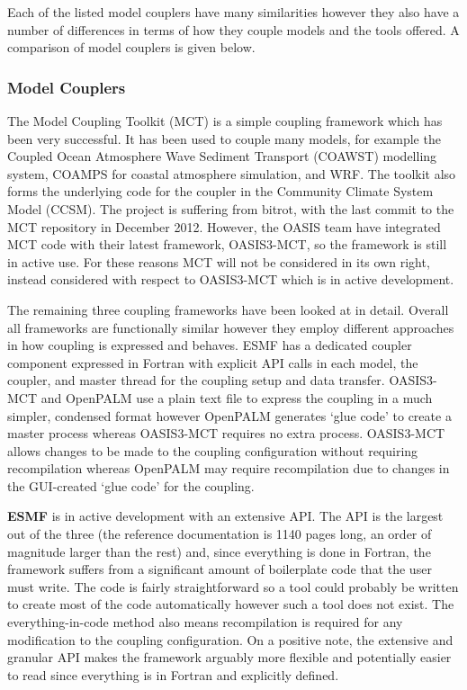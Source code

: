 \documentclass{acm_proc_article-sp}
\begin{document}
Each of the listed model couplers have many similarities however they also have
a number of differences in terms of how they couple models and the tools
offered. A comparison of model couplers is given below.

\subsubsection*{Model Couplers}

The Model Coupling Toolkit (MCT) \cite{Larson2005,Jacob2005} is a simple
coupling framework which has been very successful. It has been used to couple
many models, for example the Coupled Ocean Atmosphere Wave Sediment Transport
(COAWST) modelling system, COAMPS for coastal atmosphere simulation, and WRF.
The toolkit also forms the underlying code for the coupler in the Community
Climate System Model (CCSM). The project is suffering from bitrot, with the last
commit to the MCT repository in December 2012. However, the OASIS team have
integrated MCT code with their latest framework, OASIS3-MCT, so the framework is
still in active use. For these reasons MCT will not be considered in its own
right, instead considered with respect to OASIS3-MCT which is in active
development.

The remaining three coupling frameworks have been looked at in detail. Overall
all frameworks are functionally similar however they employ different approaches
in how coupling is expressed and behaves. ESMF has a dedicated coupler component
expressed in Fortran with explicit API calls in each model, the coupler, and
master thread for the coupling setup and data transfer. OASIS3-MCT and OpenPALM
use a plain text file to express the coupling in a much simpler, condensed
format however OpenPALM generates `glue code' to create a master process whereas
OASIS3-MCT requires no extra process. OASIS3-MCT allows changes to be made to
the coupling configuration without requiring recompilation whereas OpenPALM may
require recompilation due to changes in the GUI-created `glue code' for the
coupling.

\textbf{ESMF} is in active development with an extensive API. The API is the
largest out of the three (the reference documentation is 1140 pages long, an
order of magnitude larger than the rest) and, since everything is done in
Fortran, the framework suffers from a significant amount of boilerplate code
that the user must write. The code is fairly straightforward so a tool could
probably be written to create most of the code automatically however such a tool
does not exist. The everything-in-code method also means recompilation is
required for any modification to the coupling configuration. On a positive note,
the extensive and granular API makes the framework arguably more flexible and
potentially easier to read since everything is in Fortran and explicitly
defined.
\end{document}
